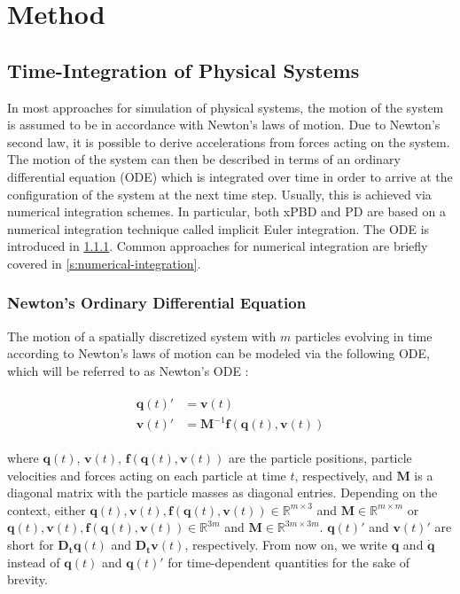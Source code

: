 \chapter{Method}\label{ch:method}

\section{Time-Integration of Physical Systems}\label{s:physical-integration}
In most approaches for simulation of physical systems, the motion of the system is assumed to be in accordance with Newton's laws of
motion. Due to Newton's second law, it is possible to derive accelerations from forces acting on the system. The motion of the system
can then be described in terms of an ordinary differential equation (ODE) which is integrated over time in order to arrive at the 
configuration of the system at the next time step. Usually, this is achieved via numerical integration schemes. In particular, both
xPBD and PD are based on a numerical integration technique called implicit Euler integration. The ODE is introduced in \cref{s:newton-ode}. 
Common approaches for numerical integration are briefly covered in \cref{s:numerical-integration}.

\subsection{Newton's Ordinary Differential Equation}\label{s:newton-ode}

The motion of a spatially discretized system with $m$ particles evolving in time according to Newton's laws of motion can be modeled via 
the following ODE, which will be referred to as Newton's ODE \cite{bouaziz2014, macklin2016, bender2017}:

\begin{align}
    \begin{split}\label{eq:newton-ode}
        \bm{q}(t)\prime &= \bm{v}(t) \\
        \bm{v}(t)\prime &= \bm{M}^{-1}\bm{f}(\bm{q}(t), \bm{v}(t))
    \end{split}
\end{align}

\noindent where $\bm{q}(t)$, $\bm{v}(t)$, $\bm{f}(\bm{q}(t), \bm{v}(t))$ are the particle positions, particle velocities and forces acting on each particle
at time $t$, respectively, and $\bm{M}$ is a diagonal matrix with the particle masses as diagonal entries. Depending on the context, either 
$\bm{q}(t), \bm{v}(t), \bm{f}(\bm{q}(t), \bm{v}(t)) \in \mathbb{R}^{m \times 3}$ and $\bm{M} \in \mathbb{R}^{m \times m}$ or $\bm{q}(t), 
\bm{v}(t), \bm{f}(\bm{q}(t), \bm{v}(t)) \in \mathbb{R}^{3m}$ and $\bm{M} \in \mathbb{R}^{3m \times 3m}$. $\bm{q}(t)\prime$ and $\bm{v}(t)\prime$ are short for $\bm{D_tq}(t)$ and
$\bm{D_tv}(t)$, respectively. From now on, we write $\bm{q}$ and $\dot{\bm{q}}$ instead of $\bm{q}(t)$ and $\bm{q}(t)\prime$ for 
time-dependent quantities for the sake of brevity.

